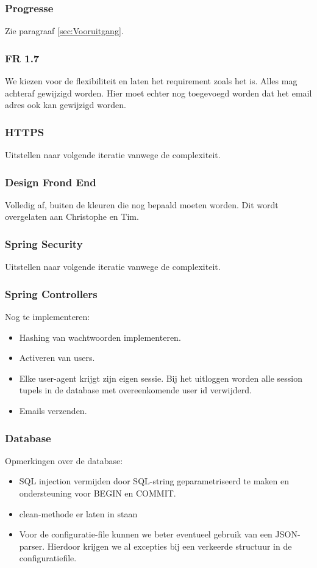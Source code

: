 \subsubsection{Progresse}
Zie paragraaf \ref{sec:Vooruitgang}.

\subsubsection{FR 1.7}
We kiezen voor de flexibiliteit en laten het requirement zoals het is. Alles mag achteraf gewijzigd worden. Hier moet echter nog toegevoegd worden dat het email adres ook kan gewijzigd worden.

\subsubsection{HTTPS}
Uitstellen naar volgende iteratie vanwege de complexiteit.

\subsubsection{Design Frond End}
Volledig af, buiten de kleuren die nog bepaald moeten worden. Dit wordt overgelaten aan Christophe en Tim.

\subsubsection{Spring Security}
Uitstellen naar volgende iteratie vanwege de complexiteit.

\subsubsection{Spring Controllers}
Nog te implementeren:
\begin{itemize}
	\item Hashing van wachtwoorden implementeren.
	\item Activeren van users.
	\item Elke user-agent krijgt zijn eigen sessie. Bij het uitloggen worden alle session tupels in de database met overeenkomende user id verwijderd.
	\item Emails verzenden.
\end{itemize}

\subsubsection{Database}
Opmerkingen over de database:
\begin{itemize}
	\item SQL injection vermijden door SQL-string geparametriseerd te maken en ondersteuning voor BEGIN en COMMIT.
	\item clean-methode er laten in staan
	\item Voor de configuratie-file kunnen we beter eventueel gebruik van een JSON-parser. Hierdoor krijgen we al excepties bij een verkeerde structuur in de configuratiefile.
\end{itemize}

